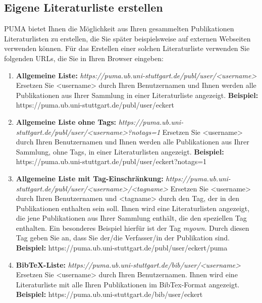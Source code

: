\documentclass[a4paper,11pt,twoside]{scrbook}
\begin{document}
\subsection{Eigene Literaturliste erstellen}
PUMA bietet Ihnen die Möglichkeit aus Ihren gesammelten Publikationen Literaturlisten zu erstellen, die Sie später beispielsweise auf externen Webseiten verwenden können. Für das Erstellen einer solchen Literaturliste verwenden Sie folgenden URLs, die Sie in Ihren Browser eingeben:
\begin{enumerate}%
    \item \textbf{Allgemeine Liste:}\newline
    \textit{https://puma.ub.uni-stuttgart.de/publ/user/<username>} \newline
    Ersetzen Sie <username> durch Ihren Benutzernamen und Ihnen werden alle Publikationen aus Ihrer Sammlung in einer Literaturliste angezeigt.\newline
    \textbf{Beispiel:} https://puma.ub.uni-stuttgart.de/publ/user/eckert 
    \item \textbf{Allgemeine Liste ohne Tags:}\newline
    \textit{https://puma.ub.uni-stuttgart.de/publ/user/<username>?notags=1}\newline
    Ersetzen Sie <username> durch Ihren Benutzernamen und Ihnen werden alle Publikationen aus Ihrer Sammlung, ohne Tags, in einer Literaturlisten angezeigt.\newline
    \textbf{Beispiel:} https://puma.ub.uni-stuttgart.de/publ/user/eckert?notags=1 
    \item \textbf{Allgemeine Liste mit Tag-Einschränkung:}\newline
    \textit{https://puma.ub.uni-stuttgart.de/publ/user/<username>/<tagname>}\newline
    Ersetzen Sie <username> durch Ihren Benutzernamen und <tagname> durch den Tag, der in den Publikationen enthalten sein soll. Ihnen wird eine Literaturlisten angezeigt, die jene Publikationen aus Ihrer Sammlung enthält, die den speziellen Tag enthalten. Ein besonderes Beispiel hierfür ist der Tag \textit{myown}. Durch diesen Tag geben Sie an, dass Sie der/die Verfasser/in der Publikation sind. \newline
    \textbf{Beispiel:} https://puma.ub.uni-stuttgart.de/publ/user/eckert/puma
    \item \textbf{BibTeX-Liste:}\newline
    \textit{https://puma.ub.uni-stuttgart.de/bib/user/<username>} \newline
    Ersetzen Sie <username> durch Ihren Benutzernamen. Ihnen wird eine Literaturliste mit alle Ihren Publikationen im BibTex-Format angezeigt.\newline
    \textbf{Beispiel:} https://puma.ub.uni-stuttgart.de/bib/user/eckert 
\end{enumerate}
\end{document}
